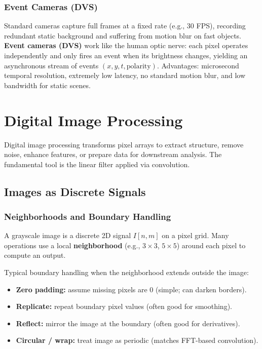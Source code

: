 \documentclass[11pt, oneside]{book}
\begin{document}
\subsection{Event Cameras (DVS)}

Standard cameras capture full frames at a fixed rate (e.g., 30 FPS), recording redundant static background
and suffering from motion blur on fast objects.
\textbf{Event cameras (DVS)} work like the human optic nerve: each pixel operates independently and only fires
an event when its brightness changes, yielding an asynchronous stream of events $(x,y,t,\text{polarity})$.
Advantages: microsecond temporal resolution, extremely low latency, no standard motion blur, and low bandwidth for static scenes.


\chapter{Digital Image Processing}

Digital image processing transforms pixel arrays to extract structure, remove noise, enhance features,
or prepare data for downstream analysis. The fundamental tool is the linear filter applied via convolution.

\section{Images as Discrete Signals}

\subsection{Neighborhoods and Boundary Handling}

\begin{defbox}[title={Discrete Image Signal}]
A grayscale image is a discrete 2D signal $I[n,m]$ on a pixel grid. Many operations use a local
\textbf{neighborhood} (e.g., $3\times 3$, $5\times 5$) around each pixel to compute an output.
\end{defbox}

Typical boundary handling when the neighborhood extends outside the image:
\begin{itemize}
  \item \textbf{Zero padding:} assume missing pixels are 0 (simple; can darken borders).
  \item \textbf{Replicate:} repeat boundary pixel values (often good for smoothing).
  \item \textbf{Reflect:} mirror the image at the boundary (often good for derivatives).
  \item \textbf{Circular / wrap:} treat image as periodic (matches FFT-based convolution).
\end{itemize}
\end{document}

